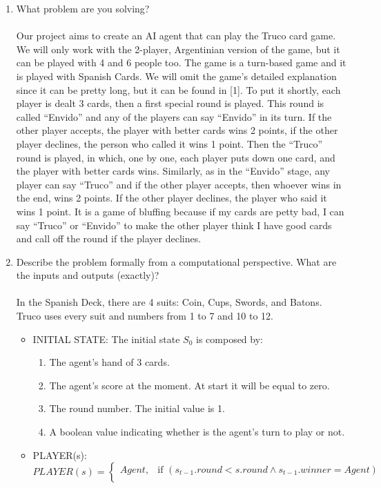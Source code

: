 \documentclass{article}
\begin{document}
\begin{enumerate}
\item What problem are you solving?
\\\\
Our project aims to create an AI agent that can play the Truco card game. We will only work with the 2-player, Argentinian version of the game, but it can be played with 4 and 6 people too. The game is a turn-based game and it is played with Spanish Cards. We will omit the game’s detailed explanation since it can be pretty long, but it can be found in [1]. To put it shortly, each player is dealt 3 cards, then a first special round is played. This round is called “Envido” and any of the players can say “Envido” in its turn. If the other player accepts, the player with better cards wins 2 points, if the other player declines, the person who called it wins 1 point. Then the “Truco” round is played, in which, one by one, each player puts down one card, and the player with better cards wins. Similarly, as in the “Envido” stage, any player can say “Truco” and if the other player accepts, then whoever wins in the end, wins 2 points. If the other player declines, the player who said it wins 1 point. It is a game of bluffing because if my cards are petty bad, I can say “Truco” or “Envido” to make the other player think I have good cards and call off the round if the player declines.
\\
\item Describe the problem formally from a computational perspective. What are the inputs and outputs (exactly)?
\\\\
In the Spanish Deck, there are 4 suits: Coin, Cups, Swords, and Batons. Truco uses every suit and numbers from 1 to 7 and 10 to 12.
\begin{itemize}
	\item INITIAL STATE: The initial state $S_0$ is composed by:
	\begin{enumerate}
		\item The agent's hand of 3 cards.
		\item The agent's score at the moment. At start it will be equal to zero.      
		\item The round number. The initial value is 1.
		\item A boolean value indicating whether is the agent's turn to play or not.
	\end{enumerate}
	\item PLAYER(s):
	\[
	PLAYER(s) = 
	\begin{cases}
	Agent,& \text{if } (s_{t-1}.round < s.round \land s_{t-1}.winner = Agent) \\ 

\end{cases}\]
\end{itemize}
\end{enumerate}
\end{document}
